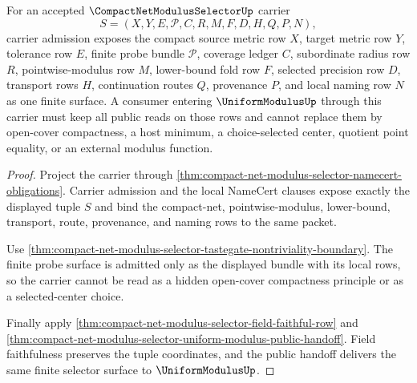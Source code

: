 \begin{theorem}
\label{thm:compact-net-modulus-selector-carrier-admission-scope}
For an accepted $\CompactNetModulusSelectorUp$ carrier
$$
S=(X,Y,E,\mathcal{P},C,R,M,F,D,H,Q,P,N),
$$
carrier admission exposes the compact source metric row $X$, target metric row $Y$, tolerance row $E$, finite probe bundle $\mathcal{P}$, coverage ledger $C$, subordinate radius row $R$, pointwise-modulus row $M$, lower-bound fold row $F$, selected precision row $D$, transport rows $H$, continuation routes $Q$, provenance $P$, and local naming row $N$ as one finite surface. A consumer entering $\UniformModulusUp$ through this carrier must keep all public reads on those rows and cannot replace them by open-cover compactness, a host minimum, a choice-selected center, quotient point equality, or an external modulus function.
\end{theorem}
\begin{proof}
Project the carrier through \autoref{thm:compact-net-modulus-selector-namecert-obligations}. Carrier admission and the local NameCert clauses expose exactly the displayed tuple $S$ and bind the compact-net, pointwise-modulus, lower-bound, transport, route, provenance, and naming rows to the same packet.

Use \autoref{thm:compact-net-modulus-selector-tastegate-nontriviality-boundary}. The finite probe surface is admitted only as the displayed bundle with its local rows, so the carrier cannot be read as a hidden open-cover compactness principle or as a selected-center choice.

Finally apply \autoref{thm:compact-net-modulus-selector-field-faithful-row} and \autoref{thm:compact-net-modulus-selector-uniform-modulus-public-handoff}. Field faithfulness preserves the tuple coordinates, and the public handoff delivers the same finite selector surface to $\UniformModulusUp$.
\end{proof}

